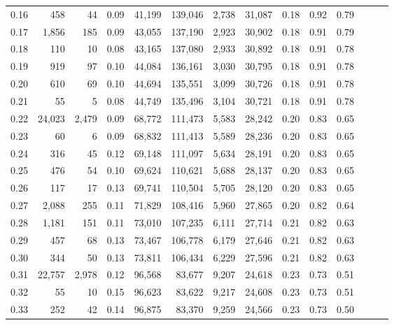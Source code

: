 \begin{tabular}{rrrrrrrrrrrrrr}
0.16 &     458 &     44 &  0.09 &   41,199 &  139,046 &   2,738 &  31,087 &  0.18 &  0.92 &      0.79 \\
0.17 &   1,856 &    185 &  0.09 &   43,055 &  137,190 &   2,923 &  30,902 &  0.18 &  0.91 &      0.79 \\
0.18 &     110 &     10 &  0.08 &   43,165 &  137,080 &   2,933 &  30,892 &  0.18 &  0.91 &      0.78 \\
0.19 &     919 &     97 &  0.10 &   44,084 &  136,161 &   3,030 &  30,795 &  0.18 &  0.91 &      0.78 \\
0.20 &     610 &     69 &  0.10 &   44,694 &  135,551 &   3,099 &  30,726 &  0.18 &  0.91 &      0.78 \\
0.21 &      55 &      5 &  0.08 &   44,749 &  135,496 &   3,104 &  30,721 &  0.18 &  0.91 &      0.78 \\
0.22 &  24,023 &  2,479 &  0.09 &   68,772 &  111,473 &   5,583 &  28,242 &  0.20 &  0.83 &      0.65 \\
0.23 &      60 &      6 &  0.09 &   68,832 &  111,413 &   5,589 &  28,236 &  0.20 &  0.83 &      0.65 \\
0.24 &     316 &     45 &  0.12 &   69,148 &  111,097 &   5,634 &  28,191 &  0.20 &  0.83 &      0.65 \\
0.25 &     476 &     54 &  0.10 &   69,624 &  110,621 &   5,688 &  28,137 &  0.20 &  0.83 &      0.65 \\
0.26 &     117 &     17 &  0.13 &   69,741 &  110,504 &   5,705 &  28,120 &  0.20 &  0.83 &      0.65 \\
0.27 &   2,088 &    255 &  0.11 &   71,829 &  108,416 &   5,960 &  27,865 &  0.20 &  0.82 &      0.64 \\
0.28 &   1,181 &    151 &  0.11 &   73,010 &  107,235 &   6,111 &  27,714 &  0.21 &  0.82 &      0.63 \\
0.29 &     457 &     68 &  0.13 &   73,467 &  106,778 &   6,179 &  27,646 &  0.21 &  0.82 &      0.63 \\
0.30 &     344 &     50 &  0.13 &   73,811 &  106,434 &   6,229 &  27,596 &  0.21 &  0.82 &      0.63 \\
0.31 &  22,757 &  2,978 &  0.12 &   96,568 &   83,677 &   9,207 &  24,618 &  0.23 &  0.73 &      0.51 \\
0.32 &      55 &     10 &  0.15 &   96,623 &   83,622 &   9,217 &  24,608 &  0.23 &  0.73 &      0.51 \\
0.33 &     252 &     42 &  0.14 &   96,875 &   83,370 &   9,259 &  24,566 &  0.23 &  0.73 &      0.50 \\

\end{tabular}
